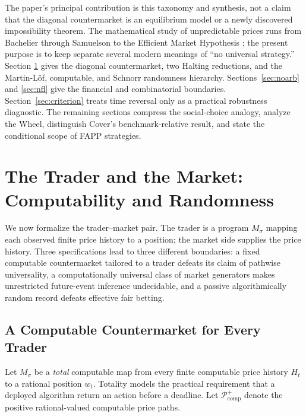 \documentclass[aps,pra,reprint,superscriptaddress,amsmath,amssymb,floatfix]{revtex4-2}
\theoremstyle{plain}
\theoremstyle{definition}
\theoremstyle{remark}
\begin{document}
The paper's principal contribution is this taxonomy and synthesis, not a claim
that the diagonal countermarket is an equilibrium model or a newly discovered
impossibility theorem. The mathematical study of unpredictable prices
runs from Bachelier through Samuelson to the Efficient Market Hypothesis
\cite{Bachelier1900,Samuelson1965,Fama1970}; the present purpose is to keep
separate several modern meanings of ``no universal strategy.'' Section
\ref{sec:computability} gives the diagonal countermarket, two Halting reductions,
and the Martin-L\"of, computable, and Schnorr randomness hierarchy.
Sections~\ref{sec:noarb} and \ref{sec:nfl} give the financial and combinatorial
boundaries. Section~\ref{sec:criterion} treats time reversal only as a practical
robustness diagnostic. The remaining sections compress the social-choice
analogy, analyze the Wheel, distinguish Cover's benchmark-relative result, and
state the conditional scope of FAPP strategies.

\section{The Trader and the Market: Computability and Randomness}
\label{sec:computability}

We now formalize the trader--market pair. The trader is a program
\(M_\sigma\) mapping each observed finite price history to a position; the
market side supplies the price history. Three specifications lead to three
different boundaries: a fixed computable countermarket tailored to a trader
defeats its claim of pathwise universality, a computationally universal class
of market generators makes unrestricted future-event inference undecidable,
and a passive algorithmically random record defeats effective fair betting.

\subsection{A Computable Countermarket for Every Trader}

Let \(M_\sigma\) be a \emph{total} computable map from every finite computable
price history \(H_t\) to a rational position \(w_t\). Totality models the
practical requirement that a deployed algorithm return an action before a
deadline. Let \(\mathcal P_{\mathrm{comp}}^{+}\) denote the positive
rational-valued computable price paths.
\end{document}
